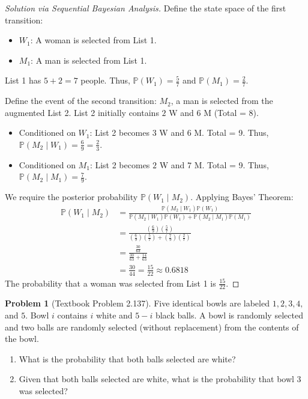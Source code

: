 \documentclass[11pt, letterpaper]{article}
\theoremstyle{definition}
\newtheorem{problem}{Problem}
\renewcommand{\P}{\mathbb{P}}
\begin{document}
\begin{proof}[Solution via Sequential Bayesian Analysis]
Define the state space of the first transition:
\begin{itemize}
    \item $W_1$: A woman is selected from List 1.
    \item $M_1$: A man is selected from List 1.
\end{itemize}
List 1 has $5+2=7$ people. Thus, $\P(W_1) = \frac{5}{7}$ and $\P(M_1) = \frac{2}{7}$.

Define the event of the second transition: $M_2$, a man is selected from the augmented List 2.
List 2 initially contains $2$ W and $6$ M (Total = 8).
\begin{itemize}
    \item Conditioned on $W_1$: List 2 becomes $3$ W and $6$ M. Total = 9. Thus, $\P(M_2 \mid W_1) = \frac{6}{9} = \frac{2}{3}$.
    \item Conditioned on $M_1$: List 2 becomes $2$ W and $7$ M. Total = 9. Thus, $\P(M_2 \mid M_1) = \frac{7}{9}$.
\end{itemize}
We require the posterior probability $\P(W_1 \mid M_2)$. Applying Bayes' Theorem:
\begin{align*}
    \P(W_1 \mid M_2) &= \frac{\P(M_2 \mid W_1)\P(W_1)}{\P(M_2 \mid W_1)\P(W_1) + \P(M_2 \mid M_1)\P(M_1)} \\
    &= \frac{ \left(\frac{6}{9}\right) \left(\frac{5}{7}\right) }{ \left(\frac{6}{9}\right) \left(\frac{5}{7}\right) + \left(\frac{7}{9}\right) \left(\frac{2}{7}\right) } \\
    &= \frac{ \frac{30}{63} }{ \frac{30}{63} + \frac{14}{63} } \\
    &= \frac{30}{44} = \frac{15}{22} \approx 0.6818
\end{align*}
The probability that a woman was selected from List 1 is $\frac{15}{22}$.
\end{proof}

\vspace{0.5cm}

\begin{problem}[Textbook Problem 2.137]
Five identical bowls are labeled $1, 2, 3, 4,$ and $5$. Bowl $i$ contains $i$ white and $5-i$ black balls. A bowl is randomly selected and two balls are randomly selected (without replacement) from the contents of the bowl.
\begin{enumerate}
    \item[\textbf{a}] What is the probability that both balls selected are white?
    \item[\textbf{b}] Given that both balls selected are white, what is the probability that bowl $3$ was selected?
\end{enumerate}
\end{problem}
\end{document}
